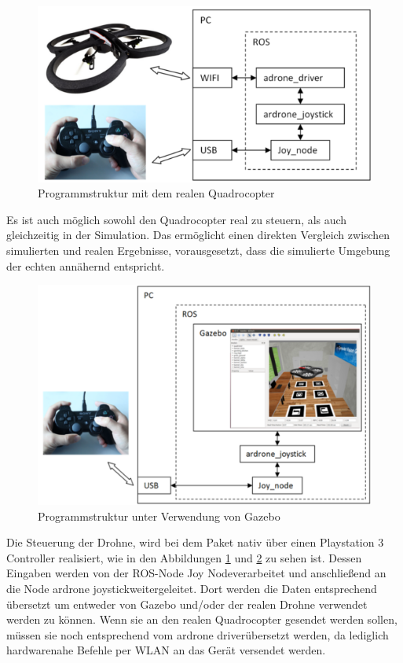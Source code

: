  \begin{figure}[ht]
 	\centering
 	\includegraphics[scale=0.9]{Bilder/real_structure.png}
 	\caption[Programmstruktur mit dem realen Quadrocopter]{Programmstruktur mit dem realen Quadrocopter \cite{real_structure}}
 	\label{fig:realstruc}
 \end{figure}
 Es ist auch möglich sowohl den Quadrocopter real zu steuern, als auch gleichzeitig in der Simulation. Das ermöglicht einen direkten Vergleich zwischen simulierten und realen Ergebnisse, vorausgesetzt, dass die simulierte Umgebung der echten annähernd entspricht. \newline
  \begin{figure}[ht]
  	\centering
  	\includegraphics[scale=1.0]{Bilder/sim_structure.png}
  	\caption[Programmstruktur unter Verwendung von Gazebo]{Programmstruktur unter Verwendung von Gazebo \cite{sim_structure}}
  	\label{fig:simstruc}
  	
  \end{figure} %
Die Steuerung der Drohne, wird bei dem Paket nativ über einen Playstation 3 Controller realisiert, wie in den Abbildungen \ref{fig:realstruc} und \ref{fig:simstruc} zu sehen ist. Dessen Eingaben werden von der ROS-Node \grqq Joy Node\grqq \space verarbeitet und anschließend an die Node \grqq ardrone joystick\grqq \space weitergeleitet. Dort werden die Daten entsprechend übersetzt um entweder von Gazebo und/oder der realen Drohne verwendet werden zu können. Wenn sie an den realen Quadrocopter gesendet werden sollen, müssen sie noch entsprechend vom \grqq ardrone driver\grqq \space übersetzt werden, da lediglich hardwarenahe Befehle per WLAN an das Gerät versendet werden. 
